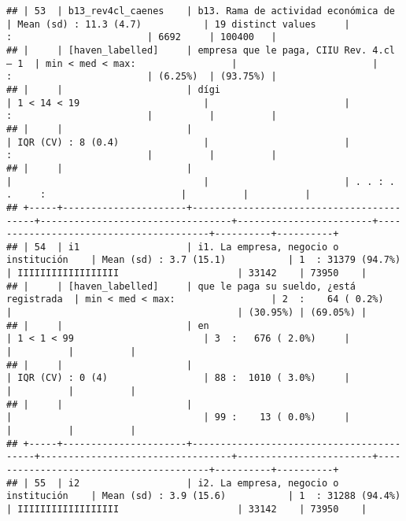 \documentclass[]{article}
\begin{document}
\begin{verbatim}
## | 53  | b13_rev4cl_caenes    | b13. Rama de actividad económica de      | Mean (sd) : 11.3 (4.7)           | 19 distinct values     |               :                        | 6692     | 100400   |
## |     | [haven_labelled]     | empresa que le paga, CIIU Rev. 4.cl – 1  | min < med < max:                 |                        |               :                        | (6.25%)  | (93.75%) |
## |     |                      | dígi                                     | 1 < 14 < 19                      |                        |               :                        |          |          |
## |     |                      |                                          | IQR (CV) : 8 (0.4)               |                        |               :                        |          |          |
## |     |                      |                                          |                                  |                        | . . : . .     :                        |          |          |
## +-----+----------------------+------------------------------------------+----------------------------------+------------------------+----------------------------------------+----------+----------+
## | 54  | i1                   | i1. La empresa, negocio o institución    | Mean (sd) : 3.7 (15.1)           | 1  : 31379 (94.7%)     | IIIIIIIIIIIIIIIIII                     | 33142    | 73950    |
## |     | [haven_labelled]     | que le paga su sueldo, ¿está registrada  | min < med < max:                 | 2  :    64 ( 0.2%)     |                                        | (30.95%) | (69.05%) |
## |     |                      | en                                       | 1 < 1 < 99                       | 3  :   676 ( 2.0%)     |                                        |          |          |
## |     |                      |                                          | IQR (CV) : 0 (4)                 | 88 :  1010 ( 3.0%)     |                                        |          |          |
## |     |                      |                                          |                                  | 99 :    13 ( 0.0%)     |                                        |          |          |
## +-----+----------------------+------------------------------------------+----------------------------------+------------------------+----------------------------------------+----------+----------+
## | 55  | i2                   | i2. La empresa, negocio o institución    | Mean (sd) : 3.9 (15.6)           | 1  : 31288 (94.4%)     | IIIIIIIIIIIIIIIIII                     | 33142    | 73950    |

\end{verbatim}
\end{document}
